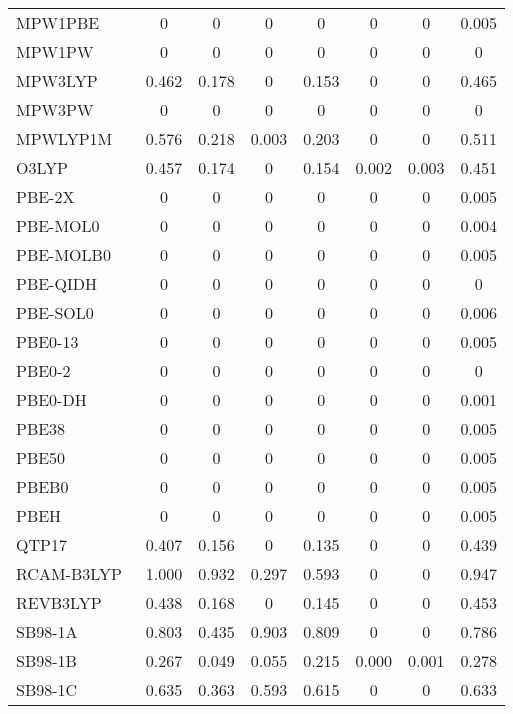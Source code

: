 \begin{table*}
\begin{tabular}{|l|c|c|c|c|c|c|c|}
MPW1PBE~\cite{Adamo1998_664} & 0 & 0 & 0 & 0 & 0 & 0 & 0.005 \\
MPW1PW~\cite{Adamo1998_664} & 0 & 0 & 0 & 0 & 0 & 0 & 0 \\
MPW3LYP~\cite{Zhao2004_6908} & 0.462 & 0.178 & 0 & 0.153 & 0 & 0 & 0.465 \\
MPW3PW~\cite{Adamo1998_664} & 0 & 0 & 0 & 0 & 0 & 0 & 0 \\
MPWLYP1M~\cite{Schultz2005_11127} & 0.576 & 0.218 & 0.003 & 0.203 & 0 & 0 & 0.511 \\
O3LYP~\cite{Hoe2001_319,Cohen2001_607} & 0.457 & 0.174 & 0 & 0.154 & 0.002 & 0.003 & 0.451 \\
PBE-2X~\cite{Tahchieva2018_4806} & 0 & 0 & 0 & 0 & 0 & 0 & 0.005 \\
PBE-MOL0~\cite{delCampo2012_104108} & 0 & 0 & 0 & 0 & 0 & 0 & 0.004 \\
PBE-MOLB0~\cite{delCampo2012_104108} & 0 & 0 & 0 & 0 & 0 & 0 & 0.005 \\
PBE-QIDH~\cite{Bremond2014_031101} & 0 & 0 & 0 & 0 & 0 & 0 & 0 \\
PBE-SOL0~\cite{delCampo2012_104108} & 0 & 0 & 0 & 0 & 0 & 0 & 0.006 \\
PBE0-13~\cite{Cortona2012_086101} & 0 & 0 & 0 & 0 & 0 & 0 & 0.005 \\
PBE0-2~\cite{Chai2012_121} & 0 & 0 & 0 & 0 & 0 & 0 & 0 \\
PBE0-DH~\cite{Bremond2011_024106} & 0 & 0 & 0 & 0 & 0 & 0 & 0.001 \\
PBE38~\cite{Grimme2010_154104} & 0 & 0 & 0 & 0 & 0 & 0 & 0.005 \\
PBE50~\cite{Bernard2012_204103} & 0 & 0 & 0 & 0 & 0 & 0 & 0.005 \\
PBEB0~\cite{delCampo2012_104108} & 0 & 0 & 0 & 0 & 0 & 0 & 0.005 \\
PBEH~\cite{Adamo1999_6158,Ernzerhof1999_5029} & 0 & 0 & 0 & 0 & 0 & 0 & 0.005 \\
QTP17~\cite{Jin2018_064111} & 0.407 & 0.156 & 0 & 0.135 & 0 & 0 & 0.439 \\
RCAM-B3LYP~\cite{Cohen2007_191109} & 1.000 & 0.932 & 0.297 & 0.593 & 0 & 0 & 0.947 \\
REVB3LYP~\cite{Lu2013_64} & 0.438 & 0.168 & 0 & 0.145 & 0 & 0 & 0.453 \\
SB98-1A~\cite{Schmider1998_9624} & 0.803 & 0.435 & 0.903 & 0.809 & 0 & 0 & 0.786 \\
SB98-1B~\cite{Schmider1998_9624} & 0.267 & 0.049 & 0.055 & 0.215 & 0.000 & 0.001 & 0.278 \\
SB98-1C~\cite{Schmider1998_9624} & 0.635 & 0.363 & 0.593 & 0.615 & 0 & 0 & 0.633 \\

\end{tabular}
\end{table*}
